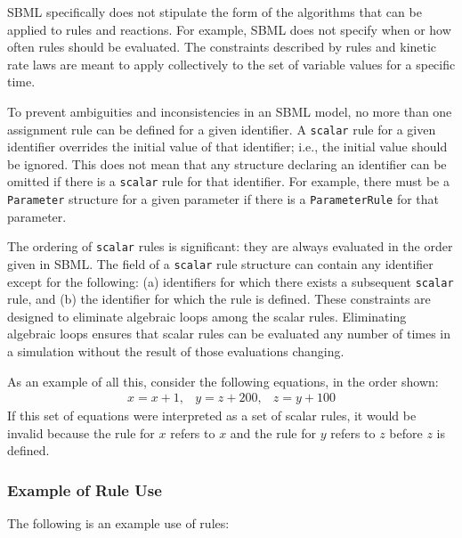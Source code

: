 \documentclass[10pt]{cekarticle}
\newenvironment{blockChanged}{\color{BrickRed}}{}
\begin{document}
\begin{blockChanged}
SBML specifically does not stipulate the form of the algorithms that can be
applied to rules and reactions.  For example, SBML does not specify when or
how often rules should be evaluated.  The constraints described by rules
and kinetic rate laws are meant to apply collectively to the set of
variable values for a specific time.

To prevent ambiguities and inconsistencies in an SBML model, no more than
one assignment rule can be defined for a given identifier.  A
\texttt{scalar} rule for a given identifier overrides the initial value of
that identifier; i.e., the initial value should be ignored.  This does not
mean that any structure declaring an identifier can be omitted if there is
a \texttt{scalar} rule for that identifier.  For example, there must be a
\texttt{Parameter} structure for a given parameter if there is a
\texttt{ParameterRule} for that parameter.

The ordering of \texttt{scalar} rules is significant: they are always
evaluated in the order given in SBML.  The  field of a
\texttt{scalar} rule structure can contain any identifier except for the
following: (a) identifiers for which there exists a subsequent
\texttt{scalar} rule, and (b) the identifier for which the rule is defined.
These constraints are designed to eliminate algebraic loops among the
scalar rules.  Eliminating algebraic loops ensures that scalar rules can be
evaluated any number of times in a simulation without the result of those
evaluations changing.

As an example of all this, consider the following equations, in the order
shown:
\begin{equation*}
  \begin{array}{lll}
    x = x + 1, & y = z + 200, & z = y + 100
  \end{array}
\end{equation*}
If this set of equations were interpreted as a set of scalar rules, it
would be invalid because the rule for $x$ refers to $x$ and the rule for
$y$ refers to $z$ before $z$ is defined.
\end{blockChanged}


\subsubsection{Example of Rule Use}

The following is an example use of rules:
\end{document}
